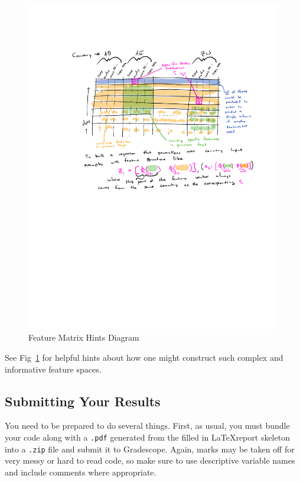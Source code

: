 \begin{figure}[tbph]
    \centering
    \includegraphics[width=1.0\textwidth]{../figs/midtermfeaturediagram.pdf}
    \caption{Feature Matrix Hints Diagram}
    \label{fig:midtermfeaturediagram}
\end{figure}


See Fig~\ref{fig:midtermfeaturediagram} for helpful hints about how one might construct such complex and informative feature spaces.

\subsection*{Submitting Your Results}


You need to be prepared to do several things.  First, as usual, you must bundle your code along with a \texttt{.pdf} generated from the filled in \LaTeX report skeleton into a \texttt{.zip} file and submit it to Gradescope. Again, marks may be taken off for very messy or hard to read code, so make sure to use descriptive variable names and include comments where appropriate.


